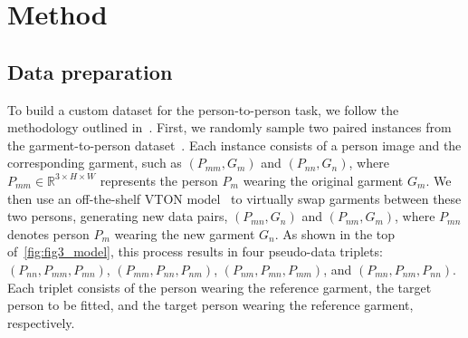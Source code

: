 \section{Method}
\label{sec:method}



\subsection{Data preparation}\label{sec:data_preparation}
To build a custom dataset for the person-to-person task, we follow the methodology outlined in~\cite{zhang2024boow}. First, we randomly sample two paired instances from the garment-to-person dataset~\cite{choi2021viton}. Each instance consists of a person image and the corresponding garment, such as $\left(P_{mm},G_{m}\right)$ and $\left(P_{nn},G_{n}\right)$, where $P_{mm}\in\mathbb{R}^{3\times H\times W}$ represents the person $P_m$ wearing the original garment $G_m$. We then use an off-the-shelf VTON model~\cite{choi2024improving} to virtually swap garments between these two persons, generating new data pairs, $\left(P_{mn},G_{n}\right)$ and $\left(P_{nm},G_{m}\right)$, where $P_{mn}$ denotes person $P_m$ wearing the new garment $G_n$. As shown in the top of~\cref{fig:fig3_model}, this process results in four pseudo-data triplets: $\left(P_{nn}, P_{mm}, P_{mn}\right)$, $\left(P_{mm}, P_{nn}, P_{nm}\right)$, $\left(P_{nm}, P_{mn}, P_{mm}\right)$, and $\left(P_{mn}, P_{nm}, P_{nn}\right)$. Each triplet consists of the person wearing the reference garment, the target person to be fitted, and the target person wearing the reference garment, respectively.


